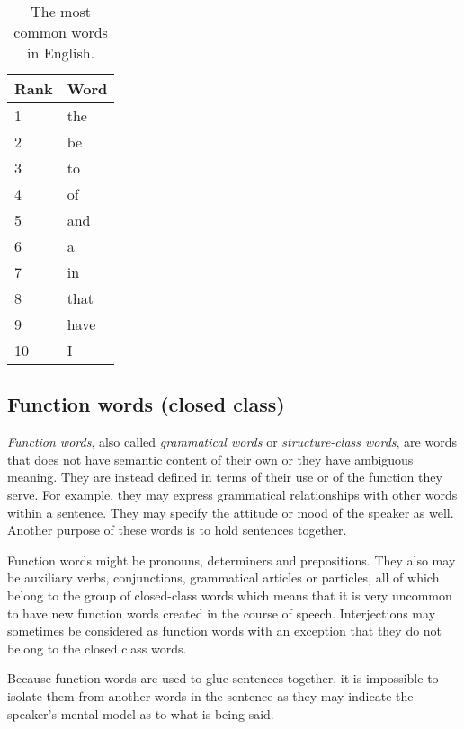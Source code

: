       \begin{table}[H]
      \centering
      \begin{tabularx}{0.3\textwidth}{|L{1}|L{1}|} \hline
         \textbf{Rank} & \textbf{Word} \\ & the \\
          2 & be \\
          3 & to \\
          4 & of \\
          5 & and \\
          6 & a \\
          7 & in \\
          8 & that \\
          9 & have \\
          10 & I \\\hline
      \end{tabularx}
      \caption{The most common words in English.}
      \label{tab:stopwords}
    \end{table}

    \subsection{Function words (closed class)}
    
      \emph{Function words}, also called \emph{grammatical words} or \emph{structure-class words}, are words that does not have semantic content of their own or they have ambiguous meaning. They are instead defined in terms of their use or of the function they serve. For example, they may express grammatical relationships with other words within a sentence. They may specify the attitude or mood of the speaker as well. Another purpose of these words is to hold sentences together.
      
      Function words might be pronouns, determiners and prepositions. They also may be auxiliary verbs, conjunctions, grammatical articles or particles, all of which belong to the group of closed-class words which means that it is very uncommon to have new function words created in the course of speech. Interjections may sometimes be considered as function words with an exception that they do not belong to the closed class words.

      Because function words are used to glue sentences together, it is impossible to isolate them from another words in the sentence as they may indicate the speaker's mental model as to what is being said.

